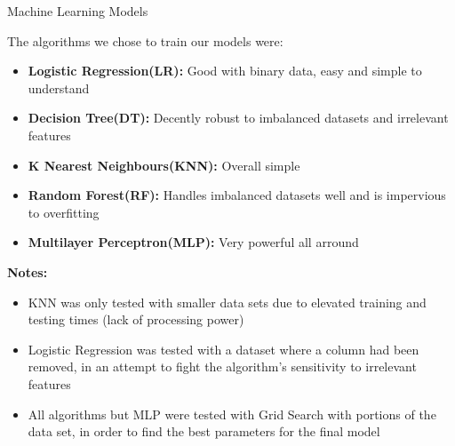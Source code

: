 

\begin{frame}{Machine Learning Models}

    The algorithms we chose to train our models were:
    \begin{itemize}
        \item \textbf{Logistic Regression(LR):} Good with binary data, easy and simple to understand
        \item \textbf{Decision Tree(DT):} Decently robust to imbalanced datasets and irrelevant features
        \item \textbf{K Nearest Neighbours(KNN):} Overall simple
        \item \textbf{Random Forest(RF):} Handles imbalanced datasets well and is impervious to overfitting
        \item \textbf{Multilayer Perceptron(MLP):} Very powerful all arround
    \end{itemize}
    
    \textbf{Notes:}
    \begin{itemize}
        \item KNN was only tested with smaller data sets due to elevated training and testing times (lack of processing power)
        \item Logistic Regression was tested with a dataset where a column had been removed, in an attempt to fight the algorithm's sensitivity to irrelevant features
        \item All algorithms but MLP were tested with Grid Search with portions of the data set, in order to find the best parameters for the final model
    \end{itemize}
\end{frame}

